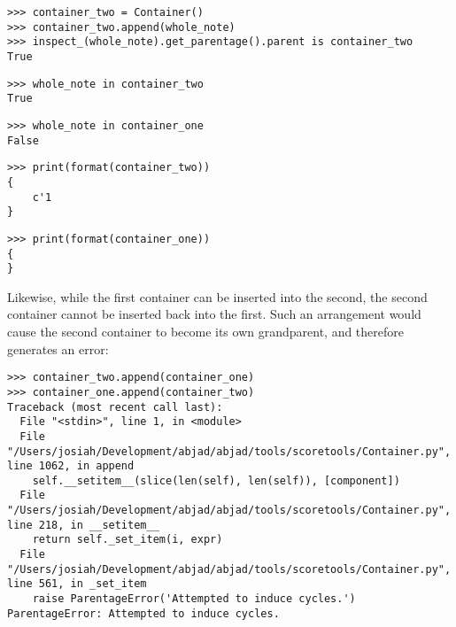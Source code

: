 \begin{comment}
<abjad>
container_two = Container()
container_two.append(whole_note)
inspect_(whole_note).get_parentage().parent is container_two
whole_note in container_two
whole_note in container_one
print(format(container_two))
print(format(container_one))
</abjad>
\end{comment}

\begin{abjadbookoutput}
\begin{singlespacing}
\vspace{-0.5\baselineskip}
\begin{verbatim}
>>> container_two = Container()
>>> container_two.append(whole_note)
>>> inspect_(whole_note).get_parentage().parent is container_two
True
\end{verbatim}
\begin{verbatim}
>>> whole_note in container_two
True
\end{verbatim}
\begin{verbatim}
>>> whole_note in container_one
False
\end{verbatim}
\begin{verbatim}
>>> print(format(container_two))
{
    c'1
}
\end{verbatim}
\begin{verbatim}
>>> print(format(container_one))
{
}
\end{verbatim}
\end{singlespacing}
\end{abjadbookoutput}

\noindent Likewise, while the first container can be inserted into the second,
the second container cannot be inserted back into the first. Such an
arrangement would cause the second container to become its own grandparent, and
therefore generates an error:

\begin{comment}
<abjad>[allow_exceptions]
container_two.append(container_one)
container_one.append(container_two)
</abjad>
\end{comment}

\begin{abjadbookoutput}
\begin{singlespacing}
\vspace{-0.5\baselineskip}
\begin{verbatim}
>>> container_two.append(container_one)
>>> container_one.append(container_two)
Traceback (most recent call last):
  File "<stdin>", line 1, in <module>
  File "/Users/josiah/Development/abjad/abjad/tools/scoretools/Container.py", line 1062, in append
    self.__setitem__(slice(len(self), len(self)), [component])
  File "/Users/josiah/Development/abjad/abjad/tools/scoretools/Container.py", line 218, in __setitem__
    return self._set_item(i, expr)
  File "/Users/josiah/Development/abjad/abjad/tools/scoretools/Container.py", line 561, in _set_item
    raise ParentageError('Attempted to induce cycles.')
ParentageError: Attempted to induce cycles.
\end{verbatim}
\end{singlespacing}
\end{abjadbookoutput}

